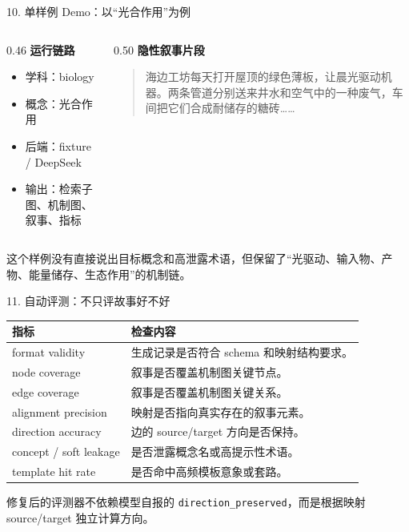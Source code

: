 \documentclass[aspectratio=169,UTF8]{ctexbeamer}
\newcommand{\code}[1]{\texttt{#1}}
\begin{document}
\begin{frame}{10. 单样例 Demo：以“光合作用”为例}
  \begin{columns}[T,onlytextwidth]
    \begin{column}{0.46\textwidth}
      \textbf{运行链路}
      \begin{itemize}
        \item 学科：biology
        \item 概念：光合作用
        \item 后端：fixture / DeepSeek
        \item 输出：检索子图、机制图、叙事、指标
      \end{itemize}
    \end{column}
    \begin{column}{0.50\textwidth}
      \textbf{隐性叙事片段}
      \begin{quote}
        \footnotesize
        海边工坊每天打开屋顶的绿色薄板，让晨光驱动机器。两条管道分别送来井水和空气中的一种废气，车间把它们合成耐储存的糖砖……
      \end{quote}
    \end{column}
  \end{columns}

  \vspace{0.7em}
  这个样例没有直接说出目标概念和高泄露术语，但保留了“光驱动、输入物、产物、能量储存、生态作用”的机制链。
\end{frame}

\begin{frame}{11. 自动评测：不只评故事好不好}
  \small
  \begin{tabularx}{\textwidth}{p{} X}
    \toprule
    指标 & 检查内容 \\
    \midrule
    format validity & 生成记录是否符合 schema 和映射结构要求。 \\
    node coverage & 叙事是否覆盖机制图关键节点。 \\
    edge coverage & 叙事是否覆盖机制图关键关系。 \\
    alignment precision & 映射是否指向真实存在的叙事元素。 \\
    direction accuracy & 边的 source/target 方向是否保持。 \\
    concept / soft leakage & 是否泄露概念名或高提示性术语。 \\
    template hit rate & 是否命中高频模板意象或套路。 \\
    \bottomrule
  \end{tabularx}

  \vspace{0.7em}
  修复后的评测器不依赖模型自报的 \code{direction\_preserved}，而是根据映射 source/target 独立计算方向。
\end{frame}
\end{document}
